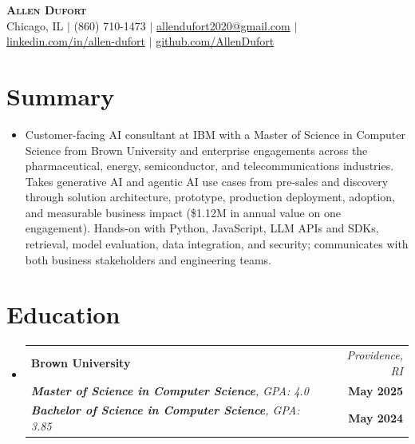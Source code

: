 \documentclass[letterpaper,10pt]{article}
\makeatletter
\newcommand{\resumeEdHeading}[6]{
  \item
  \begin{tabular*}{\textwidth}{l@{\extracolsep{\fill}}r}
    \textbf{#1} & \textit{\small #2} \\
    \textit{#3} & \textbf{\small #4} \\
    \textit{#5} & \textbf{\small #6} \\
  \end{tabular*}\vspace{-7pt}
}
\newcommand{\resumeSubHeadingListStart}{\begin{itemize}[leftmargin=0in, label={}]}
\newcommand{\resumeSubHeadingListEnd}{\end{itemize}}
\newcommand{\resumeItemListStart}{\begin{itemize}}
\newcommand{\resumeItemListEnd}{\end{itemize}\vspace{-5pt}}
\makeatother
\begin{document}
\begin{center}
  \textbf{\Huge \scshape Allen Dufort} \\ \vspace{6pt}
  \small
  Chicago, IL $|$
  (860) 710-1473 $|$
  \href{mailto:allendufort2020@gmail.com}{allendufort2020@gmail.com} $|$
  \href{https://www.linkedin.com/in/allen-dufort/}{linkedin.com/in/allen-dufort} $|$
  \href{https://github.com/AllenDufort}{github.com/AllenDufort}
\end{center}

\section{Summary}
\resumeItemListStart[leftmargin=0in, label={}]
  \item\small{
    Customer-facing AI consultant at IBM with a Master of Science in Computer Science from Brown University and enterprise engagements across the pharmaceutical, energy, semiconductor, and telecommunications industries. Takes generative AI and agentic AI use cases from pre-sales and discovery through solution architecture, prototype, production deployment, adoption, and measurable business impact (\$1.12M in annual value on one engagement). Hands-on with Python, JavaScript, LLM APIs and SDKs, retrieval, model evaluation, data integration, and security; communicates with both business stakeholders and engineering teams.
  }
\resumeItemListEnd

\section{Education}
\resumeSubHeadingListStart
  \resumeEdHeading
    {Brown University}{Providence, RI}
    {\textbf{Master of Science in Computer Science}, GPA: 4.0}{May 2025}
    {\textbf{Bachelor of Science in Computer Science}, GPA: 3.85}{May 2024}
\resumeSubHeadingListEnd

\end{document}
